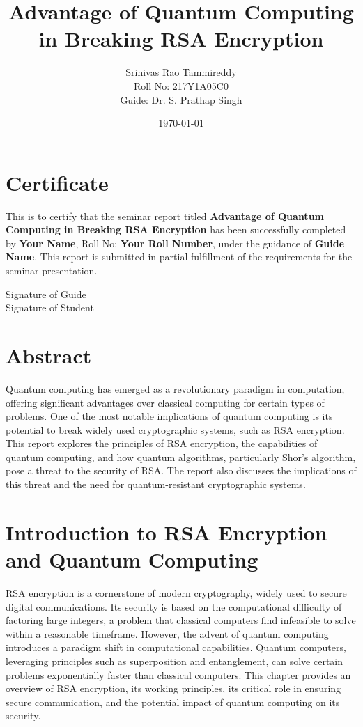 \documentclass[12pt,a4paper]{report}
\title{Advantage of Quantum Computing in Breaking RSA Encryption}
\author{Srinivas Rao Tammireddy \\ Roll No: 217Y1A05C0 \\ Guide: Dr. S. Prathap Singh}
\date{\today}
\begin{document}
\maketitle

\chapter*{Certificate}
This is to certify that the seminar report titled \textbf{Advantage of Quantum Computing in Breaking RSA Encryption} has been successfully completed by \textbf{Your Name}, Roll No: \textbf{Your Roll Number}, under the guidance of \textbf{Guide Name}. This report is submitted in partial fulfillment of the requirements for the seminar presentation.

\vspace{2cm}
\begin{flushright}
Signature of Guide \\
Signature of Student
\end{flushright}

\newpage

\tableofcontents
\listoffigures
\newpage

\chapter*{Abstract}
Quantum computing has emerged as a revolutionary paradigm in computation, offering significant advantages over classical computing for certain types of problems. One of the most notable implications of quantum computing is its potential to break widely used cryptographic systems, such as RSA encryption. This report explores the principles of RSA encryption, the capabilities of quantum computing, and how quantum algorithms, particularly Shor's algorithm, pose a threat to the security of RSA\@. The report also discusses the implications of this threat and the need for quantum-resistant cryptographic systems.
\chapter{Introduction to RSA Encryption and Quantum Computing}
\label{chap:introduction}

RSA encryption is a cornerstone of modern cryptography, widely used to secure digital communications. Its security is based on the computational difficulty of factoring large integers, a problem that classical computers find infeasible to solve within a reasonable timeframe. However, the advent of quantum computing introduces a paradigm shift in computational capabilities. Quantum computers, leveraging principles such as superposition and entanglement, can solve certain problems exponentially faster than classical computers. This chapter provides an overview of RSA encryption, its working principles, its critical role in ensuring secure communication, and the potential impact of quantum computing on its security.
\end{document}
